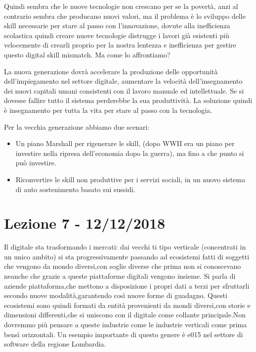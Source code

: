 \documentclass[a4page, 11pt]{article}
\begin{document}
Quindi sembra che le nuove tecnologie non crescano per se la povertà,
anzi al contrario sembra che producano nuovi valori, ma il problema è lo
sviluppo delle skill necessarie per stare al passo con l'innovazione,
dovute alla inefficienza scolastica quindi creare nuove tecnologie
distrugge i lavori già esistenti più velocemente di crearli proprio per
la nostra lentezza e inefficienza per gestire questo digital skill
mismatch. Ma come lo affrontiamo?

La nuova generazione dovrà accelerare la produzione delle opportunità
dell'impiegamento nel settore digitale, aumentare la velocità
dell'insegnamento dei nuovi capitali umani consistenti con il lavoro
manuale ed intellettuale. Se si dovesse fallire tutto il sistema
perderebbe la sua produttività. La soluzione quindi è insegnamento per
tutta la vita per stare al passo con la tecnologia.

Per la vecchia generazione abbiamo due scenari:

\begin{itemize}
	 
	\item
	Un piano Marshall per rigenerare le skill, (dopo WWII era un piano per
	investire nella ripresa dell'economia dopo la guerra), ma fino a che
	punto si può investire.
	\item
	Riconvertire le skill non produttive per i servizi sociali, in un
	nuovo sistema di auto sostenimento basato sui sussidi.
\end{itemize}
\section*{Lezione 7 - 12/12/2018}

Il digitale sta trasformando i mercati: dai vecchi
ti tipo verticale (concentrati in un unico ambito)
si sta progressivamente passando ad ecosistemi fatti di soggetti 
che vengono da mondo diversi,con soglie diverse che prima
non si conoscevano neanche che grazie a queste piattaforme digitali 
vengono insieme. Si parla di aziende piattaforma,che mettono a disposizione
i propri dati a terzi per sfruttarli secondo nuove modalità,garantendo così
nuove forme di guadagno. Questi ecosistemi sono quindi formati da entità
provenienti da mondi diversi,con storie e dimensioni differenti,che si uniscono
con il digitale come collante principale.Non dovremmo più pensare a queste
industrie come le industrie verticali come prima bensì orizzontali. Un
esempio importante di questo genere è e015 nel settore di software della
regione Lombardia.
\end{document}
